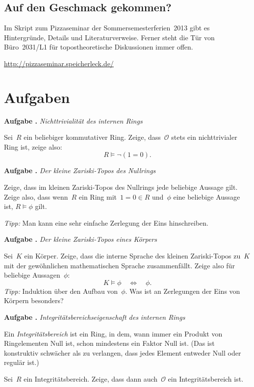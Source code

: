 \documentclass[a4paper,ngerman,12pt]{scrartcl}
\theoremstyle{definition}
\theoremstyle{plain}
\theoremstyle{remark}
\renewcommand{\O}{\mathcal{O}}
\renewcommand{\_}{\mathpunct{.}\,}
\newcommand{\?}{\,{:}\,}
\newlength{\aufgabenskip}
\newcounter{aufgabennummer}
\newenvironment{aufgabe}[1]{
  \addtocounter{aufgabennummer}{1}
  \textbf{Aufgabe \theaufgabennummer{}.} \emph{#1} \par
}{\vspace{\aufgabenskip}}
\begin{document}
\subsection*{Auf den Geschmack gekommen?}

Im Skript zum Pizzaseminar der Sommersemesterferien~2013 gibt es Hintergründe,
Details und Literaturverweise. Ferner steht die Tür von Büro~2031/L1 für
topostheoretische Diskussionen immer offen.
\begin{center}
\url{http://pizzaseminar.speicherleck.de/}
\end{center}


\appendix
\section{Aufgaben}

\begin{aufgabe}{Nichttrivialität des internen Rings}
Sei~$R$ ein beliebiger kommutativer Ring. Zeige, dass~$\O$ stets ein
nichttrivialer Ring ist, zeige also:
\[ R \models \neg(1 = 0). \]
\end{aufgabe}
\vspace{-1.5em}

\begin{aufgabe}{Der kleine Zariski-Topos des Nullrings}
Zeige, dass im kleinen Zariski-Topos des Nullrings jede beliebige Aussage gilt.
Zeige also, dass wenn~$R$ ein Ring mit~$1 = 0 \in R$ und~$\phi$ eine beliebige
Aussage ist, $R \models \phi$ gilt.

\emph{Tipp:} Man kann eine sehr einfache Zerlegung der Eins hinschreiben.
\end{aufgabe}

\begin{aufgabe}{Der kleine Zariski-Topos eines Körpers}
Sei~$K$ ein Körper. Zeige, dass die interne Sprache des kleinen Zariski-Topos
zu~$K$ mit der gewöhnlichen mathematischen Sprache zusammenfällt. Zeige also
für beliebige Aussagen~$\phi$:
\[ K \models \phi \quad\Longleftrightarrow\quad \phi. \]
\emph{Tipp:} Induktion über den Aufbau von~$\phi$. Was ist an Zerlegungen der
Eins von Körpern besonders?
\end{aufgabe}

\begin{aufgabe}{Integritätsbereichseigenschaft des internen Rings}
Ein \emph{Integritätsbereich} ist ein Ring, in dem, wann immer ein Produkt von
Ringelementen Null ist, schon mindestens ein Faktor Null ist. (Das ist
konstruktiv schwächer als zu verlangen, dass jedes Element entweder Null oder
regulär ist.)

Sei~$R$ ein Integritätsbereich. Zeige, dass dann auch~$\O$ ein
Integritätsbereich ist.
\end{aufgabe}
\end{document}
